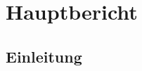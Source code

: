 \documentclass[12pt, a4paper]{report}
\begin{document}
	
	
	
		
	
	\tableofcontents
	\newpage
	
	
	
	\part{Hauptbericht}
	
	\chapter{Einleitung}
	
	
	
	
	
	
\end{document}
